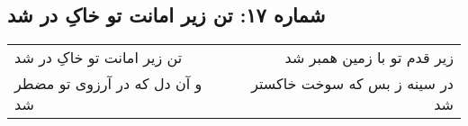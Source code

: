 \begin{center}
\section*{شماره ۱۷: تن زیر امانت تو خاکِ در شد}
\label{sec:017}
\begin{longtable}{l p{0.5cm} r}
تن زیر امانت تو خاکِ در شد
&&
زیر قدم تو با زمین همبر شد
\\
و آن دل که در آرزوی تو مضطر شد
&&
در سینه ز بس که سوخت خاکستر شد
\\
\end{longtable}
\end{center}

